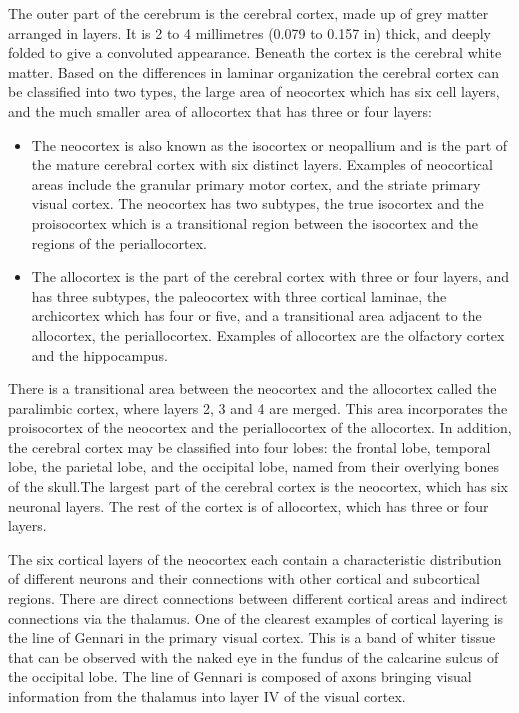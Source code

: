 The outer part of the cerebrum is the cerebral cortex, made up of grey matter arranged in layers. It is 2 to 4 millimetres (0.079 to 0.157 in) thick, and deeply folded to give a convoluted appearance. Beneath the cortex is the cerebral white matter. Based on the differences in laminar organization the cerebral cortex can be classified into two types, the large area of neocortex which has six cell layers, and the much smaller area of allocortex that has three or four layers:

\begin{itemize}
\tightlist
\item
  The neocortex is also known as the isocortex or neopallium and is the part of the mature cerebral cortex with six distinct layers. Examples of neocortical areas include the granular primary motor cortex, and the striate primary visual cortex. The neocortex has two subtypes, the true isocortex and the proisocortex which is a transitional region between the isocortex and the regions of the periallocortex.
\item
  The allocortex is the part of the cerebral cortex with three or four layers, and has three subtypes, the paleocortex with three cortical laminae, the archicortex which has four or five, and a transitional area adjacent to the allocortex, the periallocortex. Examples of allocortex are the olfactory cortex and the hippocampus.
\end{itemize}

There is a transitional area between the neocortex and the allocortex called the paralimbic cortex, where layers 2, 3 and 4 are merged. This area incorporates the proisocortex of the neocortex and the periallocortex of the allocortex. In addition, the cerebral cortex may be classified into four lobes: the frontal lobe, temporal lobe, the parietal lobe, and the occipital lobe, named from their overlying bones of the skull.The largest part of the cerebral cortex is the neocortex, which has six neuronal layers. The rest of the cortex is of allocortex, which has three or four layers.

The six cortical layers of the neocortex each contain a characteristic distribution of different neurons and their connections with other cortical and subcortical regions. There are direct connections between different cortical areas and indirect connections via the thalamus. One of the clearest examples of cortical layering is the line of Gennari in the primary visual cortex. This is a band of whiter tissue that can be observed with the naked eye in the fundus of the calcarine sulcus of the occipital lobe. The line of Gennari is composed of axons bringing visual information from the thalamus into layer IV of the visual cortex.

